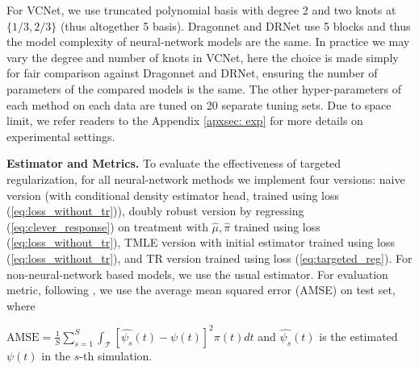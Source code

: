 For VCNet, we use truncated polynomial basis with degree 2 and two knots at $\{1/3,2/3\}$ (thus altogether 5 basis). Dragonnet and DRNet use 5 blocks and thus the model complexity of neural-network models are the same. In practice we may vary the degree and number of knots in VCNet, here the choice is made simply for fair comparison against Dragonnet and DRNet, ensuring the number of parameters of the compared models is the same.
The other hyper-parameters of each method on each data are tuned on 20 separate tuning sets.
Due to space limit, we refer readers to the Appendix \ref{apxsec: exp} for more details on experimental settings. 



\textbf{Estimator and Metrics.} 
{\color{black}To evaluate the effectiveness of targeted regularization}, for all neural-network methods we implement four versions: naive version (with conditional density estimator head, trained using loss (\ref{eq:loss_without_tr})), doubly robust version \citep{kennedy2017non} by regressing (\ref{eq:clever_response}) on treatment with $\hat \mu,\hat\pi$ trained using loss (\ref{eq:loss_without_tr}), TMLE \citep{van2006targeted} version with initial estimator trained using loss (\ref{eq:loss_without_tr}), and TR version trained using loss (\ref{eq:targeted_reg}).
For non-neural-network based models, we use the usual estimator.
For evaluation metric, following \cite{schwab2019learning}, we use the average mean squared error (AMSE) on test set, where

$
    \text{AMSE}=\frac{1}{S}\sum_{s=1}^S\int_{\mathcal{T}}[\hat{\psi_s}(t)-\psi(t)]^2\pi(t)dt
$
and $\hat{\psi_s}(t)$ is the estimated $\psi(t)$ in the $s$-th simulation.





